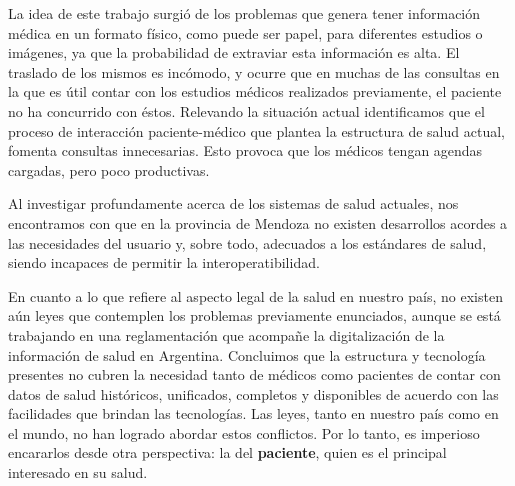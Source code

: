 \documentclass[a4paper,twocolumn,12pt]{article}
\begin{document}
La idea de este trabajo surgió de los problemas que genera tener información médica en un formato físico, como puede ser papel, para diferentes estudios o imágenes, ya que la probabilidad de extraviar esta información es alta.
El traslado de los mismos es incómodo, y ocurre que en muchas de las consultas en la que es útil contar con los estudios médicos realizados previamente, el paciente no ha concurrido con éstos. 
Relevando la situación actual identificamos que el proceso de interacción paciente-médico que plantea la estructura de salud actual, fomenta consultas innecesarias.
Esto provoca que los médicos tengan agendas cargadas, pero poco productivas.

Al investigar profundamente acerca de los sistemas de salud actuales, nos encontramos con que en la provincia de Mendoza no existen desarrollos acordes a las necesidades del usuario y, sobre todo, adecuados a los estándares de salud, siendo incapaces de permitir la interoperatibilidad.

En cuanto a lo que refiere al aspecto legal de la salud en nuestro país, no existen aún leyes que contemplen los problemas previamente enunciados, aunque se está trabajando en una reglamentación que acompañe la digitalización de la información de salud en Argentina.
Concluimos que la estructura y tecnología presentes no cubren la necesidad tanto de médicos como pacientes de contar con datos de salud históricos, unificados, completos y disponibles de acuerdo con las facilidades que brindan las tecnologías.
Las leyes, tanto en nuestro país como en el mundo, no han logrado abordar estos conflictos.
Por lo tanto, es imperioso encararlos desde otra perspectiva: la del \textbf{paciente}, quien es el principal interesado en su salud.
\end{document}
